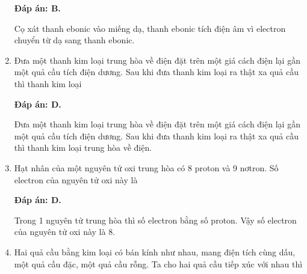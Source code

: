 \begin{enumerate}[label=\bfseries Câu \arabic*:]
{	}
	\loigiai
	{	\textbf{Đáp án: B.}
		
		Cọ xát thanh ebonic vào miếng dạ, thanh ebonic tích điện âm vì electron chuyển từ dạ sang thanh ebonic.
	}
	\item {}
	
	\cauhoi
	{Đưa một thanh kim loại trung hòa về điện đặt trên một giá cách điện lại gần một quả cầu tích điện dương. Sau khi đưa thanh kim loại ra thật xa quả cầu thì thanh kim loại
		
	}
	\loigiai
	{	\textbf{Đáp án: D.}
		
		Đưa một thanh kim loại trung hòa về điện đặt trên một giá cách điện lại gần một quả cầu tích điện dương. Sau khi đưa thanh kim loại ra thật xa quả cầu thì thanh kim loại trung hòa về điện.
	}
	\item {}
	
	\cauhoi
	{Hạt nhân của một nguyên tử oxi trung hòa có 8 proton và 9 nơtron. Số electron của nguyên tử oxi này là
		
	}
	\loigiai
	{	\textbf{Đáp án: D.}
		
		Trong 1 nguyên tử trung hòa thì số electron bằng số proton. Vậy số electron của nguyên tử oxi này là 8.
	}
	\item {}
	
	\cauhoi
	{Hai quả cầu bằng kim loại có bán kính như nhau, mang điện tích cùng dấu, một quả cầu đặc, một quả cầu rỗng. Ta cho hai quả cầu tiếp xúc với nhau thì
		
}
\end{enumerate}
